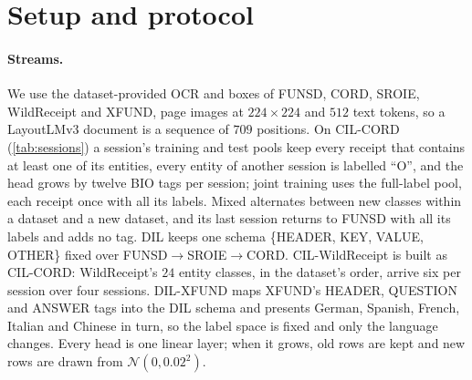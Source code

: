 
\section{Setup and protocol}
\label{app:setup}
\begin{table}[t]
\centering\scriptsize
\setlength{\tabcolsep}{2.5pt}
\caption{\textbf{Benchmark settings}: six streams over five document datasets (sessions: \cref{app:setup}). Train/test documents: FUNSD 149/50, SROIE 626/347, CORD 800/100. AA: mean F1 of the final model over the sessions; full-label F1: on the unmasked test set of the stream's dataset (\cref{sec:setup}).}
\label{tab:bench}

\end{table}


\paragraph{Streams.} We use the dataset-provided OCR and boxes of FUNSD, CORD, SROIE, WildReceipt and XFUND, page images at $224{\times}224$ and $512$ text tokens, so a LayoutLMv3 document is a sequence of $709$ positions. On CIL-CORD (\cref{tab:sessions}) a session's training and test pools keep every receipt that contains at least one of its entities, every entity of another session is labelled ``O'', and the head grows by twelve BIO tags per session; joint training uses the full-label pool, each receipt once with all its labels. Mixed alternates between new classes within a dataset and a new dataset, and its last session returns to FUNSD with all its labels and adds no tag. DIL keeps one schema \{HEADER, KEY, VALUE, OTHER\} fixed over FUNSD$\rightarrow$SROIE$\rightarrow$CORD. CIL-WildReceipt is built as CIL-CORD: WildReceipt's $24$ entity classes, in the dataset's order, arrive six per session over four sessions. DIL-XFUND maps XFUND's HEADER, QUESTION and ANSWER tags into the DIL schema and presents German, Spanish, French, Italian and Chinese in turn, so the label space is fixed and only the language changes. Every head is one linear layer; when it grows, old rows are kept and new rows are drawn from $\mathcal{N}(0,0.02^2)$.

